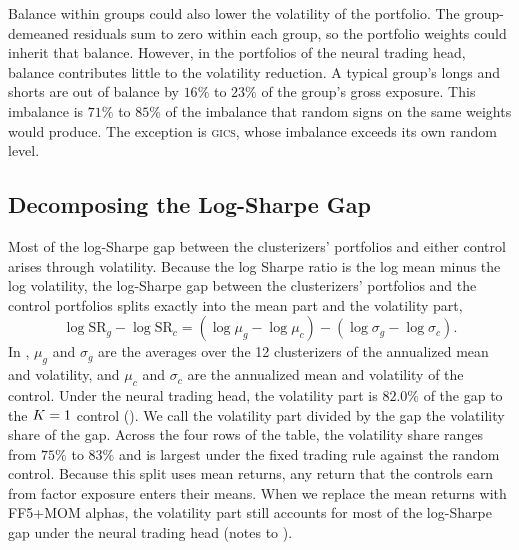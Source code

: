 Balance within groups could also lower the volatility of the portfolio. The group-demeaned residuals sum to zero within each group, so the portfolio weights could inherit that balance. However, in the portfolios of the neural trading head, balance contributes little to the volatility reduction. A typical group's longs and shorts are out of balance by $16\%$ to $23\%$ of the group's gross exposure. This imbalance is $71\%$ to $85\%$ of the imbalance that random signs on the same weights would produce. The exception is \textsc{gics}, whose imbalance exceeds its own random level.

\subsection{Decomposing the Log-Sharpe Gap}
\label{sec:split}

Most of the log-Sharpe gap between the clusterizers' portfolios and either control arises through volatility. Because the log Sharpe ratio is the log mean minus the log volatility, the log-Sharpe gap between the clusterizers' portfolios and the control portfolios splits exactly into the mean part and the volatility part,
\begin{equation}\label{eq:split}
\log \mathrm{SR}_g-\log \mathrm{SR}_c=(\log\mu_g-\log\mu_c)-(\log\sigma_g-\log\sigma_c).
\end{equation}
In , $\mu_g$ and $\sigma_g$ are the averages over the 12 clusterizers of the annualized mean and volatility, and $\mu_c$ and $\sigma_c$ are the annualized mean and volatility of the control. Under the neural trading head, the volatility part is $82.0\%$ of the gap to the $K=1$ control (). We call the volatility part divided by the gap the volatility share of the gap. Across the four rows of the table, the volatility share ranges from $75\%$ to $83\%$ and is largest under the fixed trading rule against the random control. Because this split uses mean returns, any return that the controls earn from factor exposure enters their means. When we replace the mean returns with FF5+MOM alphas, the volatility part still accounts for most of the log-Sharpe gap under the neural trading head (notes to ).

